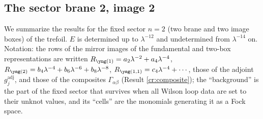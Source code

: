 \subsection{The sector brane 2, image 2}\label{app:n2}
We summarize the results for the fixed sector $n = 2$ (two brane and two image boxes) of the trefoil. $E$ is determined up to $\lambda^{-12}$ and undetermined from $\lambda^{-14}$ on. Notation: the rows of the mirror images of the fundamental and two-box representations are written $R_{\yone} = a_2\lambda^{-2} + a_4\lambda^{-4}$, $R_{\ytwo} = b_4\lambda^{-4} + b_6\lambda^{-6} + b_8\lambda^{-8}$, $R_{\yoneone} = c_4\lambda^{-4} + \cdots$, those of the adjoint $g^{\mathrm{adj}}_j$, and those of the composites $\Gamma_{\alpha\beta}$ (Result \ref{cr:composite}); the ``background'' is the part of the fixed sector that survives when all Wilson loop data are set to their unknot values, and its ``cells'' are the monomials generating it as a Fock space.
